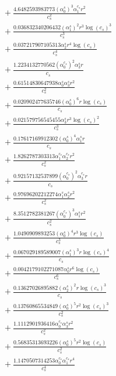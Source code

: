 \documentclass[10pt]{article}
\begin{document}
\begin{align*}
&{}  + \frac{4.6482593983773 \left(\alpha_{0}^s\right)^{3} \alpha_{1}^{c_s} r^{2}}{c_{s}^{2}} \\
&{}  + \frac{0.036832340206432 \left(\alpha_{1}^s\right)^{2} r^{3} \log{\left(c_{s} \right)}^{3}}{c_{s}^{3}} \\
&{}  + \frac{0.037217907105313 \alpha_{2}^s r^{4} \log{\left(c_{s} \right)}}{c_{s}^{4}} \\
&{}  + \frac{1.2234132770562 \left(\alpha_{0}^{c_s}\right)^{2} \alpha_{3}^s r}{c_{s}} \\
&{}  + \frac{0.61514830647938 \alpha_{0}^s \alpha_{3}^s r^{2}}{c_{s}^{2}} \\
&{}  + \frac{0.020902477635746 \left(\alpha_{0}^s\right)^{6} r \log{\left(c_{s} \right)}}{c_{s}} \\
&{}  + \frac{0.021579756545455 \alpha_{3}^s r^{3} \log{\left(c_{s} \right)}^{2}}{c_{s}^{3}} \\
&{}  + \frac{0.17617169912302 \left(\alpha_{0}^s\right)^{4} \alpha_{1}^s r}{c_{s}} \\
&{}  + \frac{1.8262787303313 \alpha_{1}^{c_s} \alpha_{2}^{c_s} r^{2}}{c_{s}^{2}} \\
&{}  + \frac{0.92157132537899 \left(\alpha_{0}^{c_s}\right)^{2} \alpha_{3}^{c_s} r}{c_{s}} \\
&{}  + \frac{0.97696202212274 \alpha_{1}^s \alpha_{2}^s r^{2}}{c_{s}^{2}} \\
&{}  + \frac{8.3512782381267 \left(\alpha_{0}^{c_s}\right)^{3} \alpha_{1}^s r^{2}}{c_{s}^{2}} \\
&{}  + \frac{1.0490909893253 \left(\alpha_{0}^s\right)^{4} r^{3} \log{\left(c_{s} \right)}}{c_{s}^{3}} \\
&{}  + \frac{0.067029189589007 \left(\alpha_{1}^s\right)^{3} r \log{\left(c_{s} \right)}^{4}}{c_{s}} \\
&{}  + \frac{0.0042179102271087 \alpha_{0}^s r^{6} \log{\left(c_{s} \right)}}{c_{s}^{6}} \\
&{}  + \frac{0.13627026895882 \left(\alpha_{2}^s\right)^{2} r \log{\left(c_{s} \right)}^{3}}{c_{s}} \\
&{}  + \frac{0.13760865534849 \left(\alpha_{0}^s\right)^{5} r^{2} \log{\left(c_{s} \right)}^{3}}{c_{s}^{2}} \\
&{}  + \frac{1.1112901936416 \alpha_{0}^{c_s} \alpha_{3}^s r^{2}}{c_{s}^{2}} \\
&{}  + \frac{0.56835313693226 \left(\alpha_{0}^s\right)^{5} r^{2} \log{\left(c_{s} \right)}}{c_{s}^{2}} \\
&{}  + \frac{1.1470507314253 \alpha_{0}^{c_s} \alpha_{1}^{c_s} r^{4}}{c_{s}^{4}} \\

\end{align*}
\end{document}

